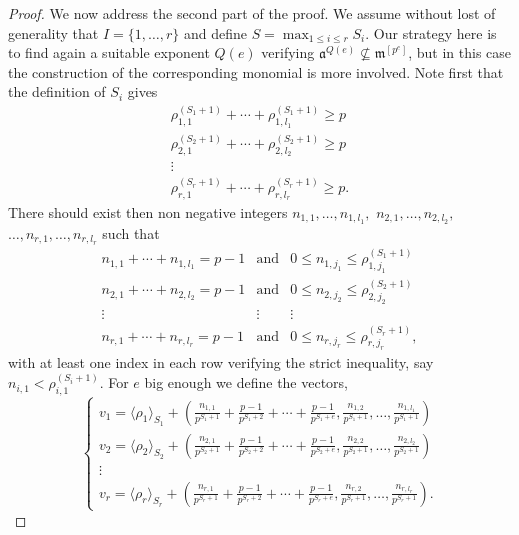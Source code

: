 \documentclass[10pt,a4paper]{amsart}
\newcommand{\fa}{\mathfrak{a}}
\newcommand{\m}{\mathfrak{m}}
\begin{document}
\begin{proof}
	We now address the second part of the proof. We assume without lost of generality that $I=\{1,\ldots,r\}$ and define $S=\max_{1 \leq i \leq r}S_i$.  
	Our strategy here is to find again a suitable exponent $Q(e)$ verifying $\fa^{Q(e)} \nsubseteq  \m^{[p^{e}]}$, but in this case the construction of the corresponding monomial is more involved. Note first that the definition of $S_i$ gives
\begin{equation*}
\begin{matrix}
\rho_{1,1}^{(S_1+1)}+ \cdots + \rho_{1,l_1}^{(S_1+1)} \geq p\\
\rho_{2,1}^{(S_2+1)}+ \cdots + \rho_{2,l_2}^{(S_2+1)} \geq p\\
\vdots \\
\rho_{r,1}^{(S_r+1)}+ \cdots + \rho_{r,l_r}^{(S_r+1)} \geq p.
\end{matrix}
\end{equation*}
There should exist then non negative integers $n_{1,1}, \ldots, n_{1,l_1},$  $n_{2,1}, \ldots, n_{2,l_2},$ $\ldots, n_{r,1}, \ldots, n_{r,l_r}$ such that
\begin{equation*}
\begin{matrix}
n_{1,1}+ \cdots + n_{1,l_1} = p-1 &  \mathrm{and}& 0 \leq n_{1,j_1} \leq \rho_{1,j_1}^{(S_1+1)}\\
n_{2,1}+ \cdots + n_{2,l_2}= p-1 &  \mathrm{and}&0 \leq n_{2,j_2} \leq \rho_{2,j_2}^{(S_2+1)}\\
\vdots & \vdots & \vdots\\
n_{r,1}+ \cdots + n_{r,l_r} = p-1 &  \mathrm{and}& 0 \leq n_{r,j_r} \leq \rho_{r,j_r}^{(S_r+1)},
\end{matrix}
\end{equation*}
with at least one index in each row verifying the strict inequality, say $n_{i,1}<\rho_{i,1}^{(S_i+1)}$. 
For $e$ big enough we define the vectors, 
\[
\begin{cases}
		v_1=\langle \rho_1 \rangle_{S_1}+\left(\frac{n_{1,1}}{p^{S_1+1}}+\frac{p-1}{p^{S_1+2}}+ \cdots + \frac{p-1}{p^{S_1+e}},\frac{n_{1,2}}{p^{S_1+1}}, \ldots, \frac{n_{1,l_1}}{p^{S_1+1}} \right)\\
		v_2=\langle \rho_2 \rangle_{S_2}+\left(\frac{n_{2,1}}{p^{S_2+1}}+\frac{p-1}{p^{S_2+2}}+ \cdots + \frac{p-1}{p^{S_2+e}},\frac{n_{2,2}}{p^{S_2+1}}, \ldots, \frac{n_{2,l_2}}{p^{S_2+1}} \right)\\
         \vdots \\
		v_r=\langle \rho_r \rangle_{S_r}+\left(\frac{n_{r,1}}{p^{S_r+1}}+\frac{p-1}{p^{S_r+2}}+ \cdots + \frac{p-1}{p^{S_r+e}},\frac{n_{r,2}}{p^{S_r+1}}, \ldots, \frac{n_{r,l_r}}{p^{S_r+1}} \right).

\end{cases}\]
\end{proof}
\end{document}

